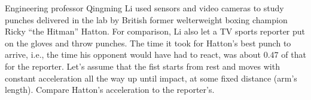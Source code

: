 Engineering professor Qingming Li used sensors and video cameras to study 
punches delivered in the lab by British former welterweight
boxing champion Ricky ``the Hitman'' Hatton. For comparison, Li
also let a TV sports reporter put on the gloves and throw punches. The time it took for
Hatton's best punch to arrive, i.e., the time his opponent would have 
had to react, was about $0.47$ of that for the reporter.
Let's assume that the fist starts from rest and moves with constant
acceleration all the way up until impact, at some fixed distance
(arm's length). Compare Hatton's acceleration to the reporter's.\answercheck
